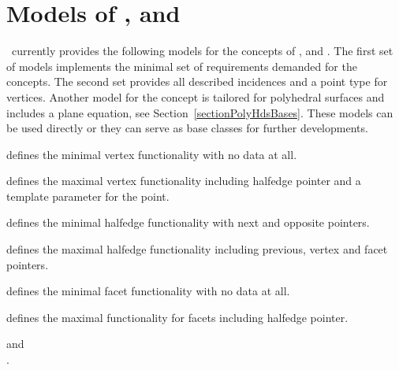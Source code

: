 \ccTagDefaults


\newpage
\section{Models of \protect{},
  \protect{} and \protect{}}
\label{sectionHdsBasesModels}

\cgal\ currently provides the following models for the concepts of
,  and .  The
first set of models implements the minimal set of requirements
demanded for the concepts. The second set provides all described
incidences and a point type for vertices. Another model for the
 concept is tailored for polyhedral surfaces and
includes a plane equation, see Section~\ref{sectionPolyHdsBases}.
These models can be used directly or they can serve as base classes
for further developments.



    {defines the minimal vertex functionality with no data at all.}

    {defines the maximal vertex functionality including halfedge
      pointer and a template parameter for the point.}

    {defines the minimal halfedge functionality with next and opposite
      pointers.}

    {defines the maximal halfedge functionality including previous,
      vertex and facet pointers.}

    {defines the minimal facet functionality with no data at all.}

    {defines the maximal functionality for facets including halfedge pointer.}


\ccSeeAlso

 and\\
.



